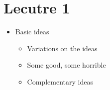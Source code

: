 \documentclass{article}
\begin{document}
    \section{Lecutre 1}
    \begin{itemize}
        \item Basic ideas
            \begin{itemize}
                \item Variations on the ideas
                \item Some good, some horrible
                \item Complementary ideas
            \end{itemize}

    \end{itemize}
\end{document}
